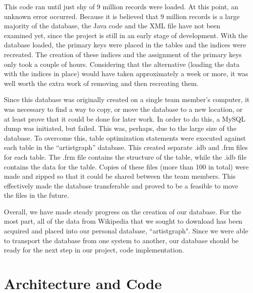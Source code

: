 \documentclass{sig-alternate}
\begin{document}
This code ran until just shy of 9 million records were loaded. At this point, an unknown error occurred.
Because it is believed that 9 million records is a large majority of the
database, the Java code and the XML file have not been examined yet, since the project is still in an early stage of development. 
With the database loaded, the primary keys were placed in the tables and the indices were recreated.  
The creation of these indices and the assignment of the primary keys only took a couple of hours. 
Considering that the alternative (loading the data with the indices in place) would have taken approximately a week or more,
it was well worth the extra work of removing and then recreating them.
 
Since this database was originally created on a single team member's computer, it was necessary to find a way to copy, 
or move the database to a new location, or at least prove that it could be done for later work.
In order to do this, a MySQL dump was initiated, but failed. This was, perhaps, due to the large size of the database. 
To overcome this, table optimization statements were executed against each table in the ``artistgraph'' database. 
This created separate .idb and .frm files for each table. The .frm file contains the structure of the table, while the 
.idb file contains the data for the table. Copies of these files (more than 100 in total) were made and zipped so that it could 
be shared between the team members. This effectively made the database transferable and proved to be a feasible to move the files in the future.
 
Overall, we have made steady progress on the creation of our database. For the most part, 
all of the data from Wikipedia that we sought to download has been acquired and placed into
our personal database, ``artistgraph". Since we were able to transport the database from one system to another, 
our database should be ready for the next step in our project, code implementation. 

\section{Architecture and Code}
\label{architecture and code}
\end{document}
